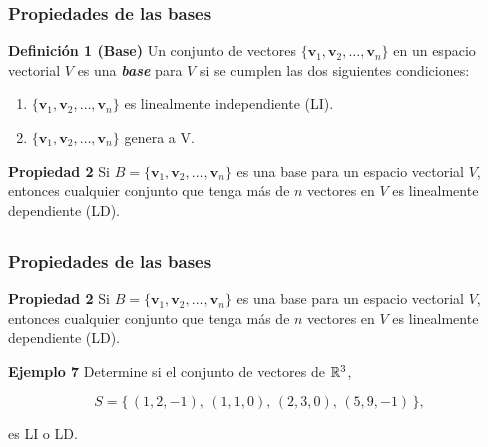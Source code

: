 \begin{frame}\frametitle{Propiedades de las bases}

\begin{block}{\textbf{Definición 1 (Base)}}
	\justifying
	Un conjunto de vectores $\{\mathbf{v}_1, \mathbf{v}_2, \hdots , \mathbf{v}_n \}$ en un espacio vectorial $V$ es 
	una \textbf{\textit{base}} para $V$ si se cumplen las dos siguientes condiciones:
	\begin{enumerate}
		\item[\labelname{$a$}] $\{\mathbf{v}_1, \mathbf{v}_2, \hdots , \mathbf{v}_n \}$ es linealmente independiente (LI).
		\item[\labelname{$b$}] $\{\mathbf{v}_1, \mathbf{v}_2, \hdots , \mathbf{v}_n \}$ genera a V.
	\end{enumerate}
\end{block}


\begin{prop}{\textbf{Propiedad 2}}\justifying
	Si $B=\{\mathbf{v}_1, \mathbf{v}_2, \hdots , \mathbf{v}_n \}$ es una base para un espacio vectorial $V$, entonces
	cualquier conjunto que tenga más de $n$ vectores en $V$ es linealmente dependiente (LD).
\end{prop}	

\end{frame}


\subsection{}

\begin{frame}\frametitle{Propiedades de las bases}

\begin{prop}{\textbf{Propiedad 2}}\justifying
	Si $B=\{\mathbf{v}_1, \mathbf{v}_2, \hdots , \mathbf{v}_n \}$ es una base para un espacio vectorial $V$, entonces
	cualquier conjunto que tenga más de $n$ vectores en $V$ es linealmente dependiente (LD).
\end{prop}	

\vspace{0mm} 

\begin{ej}{\textbf{Ejemplo 7}} \justifying
	Determine si el conjunto de vectores de $\mathbb{R}^3$,
	
	\vspace{-2mm}
	\[
	S = \{ \, (1,2,-1),\, (1,1,0),\, (2,3,0),\, (5,9,-1) \, \},
	\]
	
	\vspace{-2mm}
	es LI o LD.
\end{ej}	


\end{frame}


